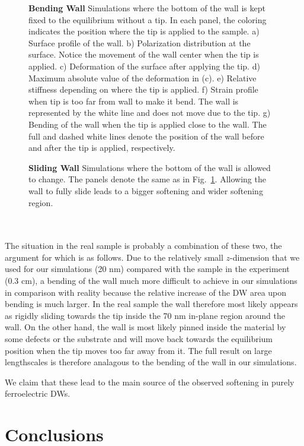\begin{figure}
	\caption{\label{fig:BTO_bending_sim}{\bf Bending Wall} Simulations where the bottom of the wall is kept fixed to the equilibrium without a tip. In each panel, the coloring indicates the position where the tip is applied to the sample. a) Surface profile of the wall. b) Polarization distribution at the surface. Notice the movement of the wall center when the tip is applied. c) Deformation of the surface after applying the tip. d) Maximum absolute value of the deformation in (c). e) Relative stiffness depending on where the tip is applied. f) Strain profile when tip is too far from wall to make it bend. The wall is represented by the white line and does not move due to the tip. g) Bending of the wall when the tip is applied close to the wall. The full and dashed white lines denote the position of the wall before and after the tip is applied, respectively.}
\end{figure}
\begin{figure}
	\caption{\label{fig:BTO_sliding_sim}{\bf Sliding Wall} Simulations where the bottom of the wall is allowed to change. The panels denote the same as in Fig.~\ref{fig:BTO_bending_sim}. Allowing the wall to fully slide leads to a bigger softening and wider softening region.}
\end{figure}
\\\\
The situation in the real sample is probably a combination of these two, the argument for which is as follows.
Due to the relatively small $z$-dimension that we used for our simulations (20 nm) compared with the sample in the experiment (0.3 cm), a bending of the wall much more difficult to achieve in our simulations in comparison with reality because the relative increase of the DW area upon bending is much larger. 
In the real sample the wall therefore most likely appears as rigidly sliding towards the tip inside the 70 nm in-plane region around the wall.
On the other hand, the wall is most likely pinned inside the material by some defects or the substrate and will move back towards the equilibrium position when the tip moves too far away from it. The full result on large lengthscales is therefore analagous to the bending of the wall in our simulations.

We claim that these lead to the main source of the observed softening in purely ferroelectric DWs.
\section{Conclusions}


